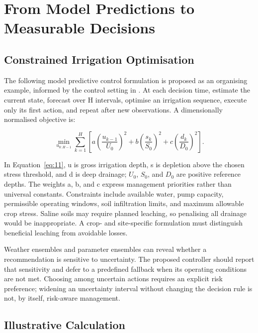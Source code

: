 \documentclass[acmsmall,screen,nonacm]{acmart}
\begin{document}
\section{From Model Predictions to Measurable Decisions}

\label{sec:8}

\subsection{Constrained Irrigation Optimisation}

\label{sec:8-1}

The following model predictive control formulation is proposed as an organising example, informed by the control setting in \cite{R18}. At each decision time, estimate the current state, forecast over H intervals, optimise an irrigation sequence, execute only its first action, and repeat after new observations. A dimensionally normalised objective is:

\begin{equation}
\min_{u_{0:H-1}}\sum_{k=1}^{H}\left[a\left(\frac{u_{k-1}}{U_0}\right)^2+b\left(\frac{s_k}{S_0}\right)^2+c\left(\frac{d_k}{D_0}\right)^2\right].
\label{eq:11}
\end{equation}

In Equation~\eqref{eq:11}, u is gross irrigation depth, s is depletion above the chosen stress threshold, and d is deep drainage; $U_{0}$, $S_{0}$, and $D_{0}$ are positive reference depths. The weights a, b, and c express management priorities rather than universal constants. Constraints include available water, pump capacity, permissible operating windows, soil infiltration limits, and maximum allowable crop stress. Saline soils may require planned leaching, so penalising all drainage would be inappropriate. A crop- and site-specific formulation must distinguish beneficial leaching from avoidable losses.

Weather ensembles and parameter ensembles can reveal whether a recommendation is sensitive to uncertainty. The proposed controller should report that sensitivity and defer to a predefined fallback when its operating conditions are not met. Choosing among uncertain actions requires an explicit risk preference; widening an uncertainty interval without changing the decision rule is not, by itself, risk-aware management.

\subsection{Illustrative Calculation}
\end{document}
